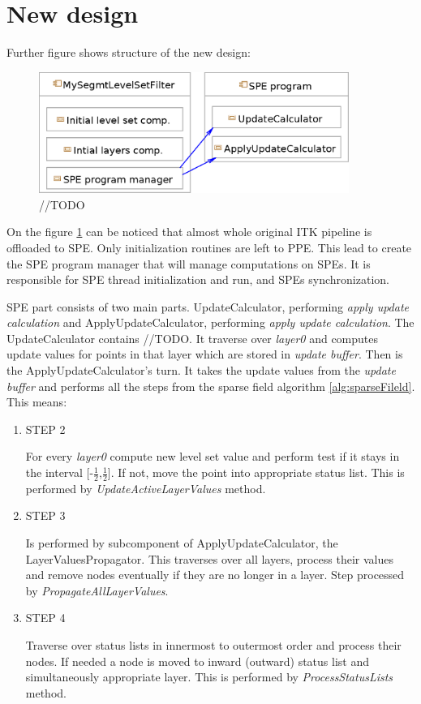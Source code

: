 \section{New design}

Further figure shows structure of the new design:

\begin{figure}
    \centering
    \includegraphics[width=0.9\textwidth]{data/newDesign}
    \caption[Diagram of new design components]{//TODO}
    \label{fg:newDesign}
\end{figure}

On the figure \ref{fg:newDesign} can be noticed that almost whole original ITK pipeline is offloaded to SPE.
Only initialization routines are left to PPE. This lead to create the SPE program manager that will manage computations on SPEs.
It is responsible for SPE thread initialization and run, and SPEs synchronization.

SPE part consists of two main parts.
UpdateCalculator, performing \emph{apply update calculation} and ApplyUpdateCalculator, performing \emph{apply update calculation}.
The UpdateCalculator contains //TODO. It traverse over \emph{layer0} and computes update values for points in that layer which are stored in \emph{update buffer}.
Then is the ApplyUpdateCalculator's turn.
It takes the update values from the \emph{update buffer} and performs all the steps from the sparse field algorithm \ref{alg:sparseFileld}.
This means:
\begin{enumerate}
\item STEP 2
\par
For every \emph{layer0} compute new level set value and perform test if it stays in the interval [-$\frac{1}{2}$,$\frac{1}{2}$].
If not, move the point into appropriate status list.
This is performed by \emph{UpdateActiveLayerValues} method.

\item STEP 3
\par
Is performed by subcomponent of ApplyUpdateCalculator, the LayerValuesPropagator.
This traverses over all layers, process their values and remove nodes eventually if they are no longer in a layer.
Step processed by \emph{PropagateAllLayerValues}.

\item STEP 4
\par
Traverse over status lists in innermost to outermost order and process their
nodes. If needed a node is moved to inward (outward) status list and
simultaneously appropriate layer. This is performed by \emph{ProcessStatusLists}
method.
\end{enumerate}

